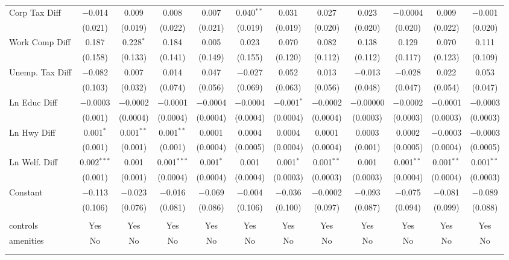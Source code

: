 \begin{table}[!htbp]
\begin{tabular}{@{\extracolsep{5pt}}lccccccccccc}
  Corp Tax Diff & $-$0.014 & 0.009 & 0.008 & 0.007 & 0.040$^{**}$ & 0.031 & 0.027 & 0.023 & $-$0.0004 & 0.009 & $-$0.001 \\ 
  & (0.021) & (0.019) & (0.022) & (0.021) & (0.019) & (0.019) & (0.020) & (0.020) & (0.020) & (0.022) & (0.020) \\ 
  Work Comp Diff & 0.187 & 0.228$^{*}$ & 0.184 & 0.005 & 0.023 & 0.070 & 0.082 & 0.138 & 0.129 & 0.070 & 0.111 \\ 
  & (0.158) & (0.133) & (0.141) & (0.149) & (0.155) & (0.120) & (0.112) & (0.112) & (0.117) & (0.123) & (0.109) \\ 
  Unemp. Tax Diff & $-$0.082 & 0.007 & 0.014 & 0.047 & $-$0.027 & 0.052 & 0.013 & $-$0.013 & $-$0.028 & 0.022 & 0.053 \\ 
  & (0.103) & (0.032) & (0.074) & (0.056) & (0.069) & (0.063) & (0.056) & (0.048) & (0.047) & (0.054) & (0.047) \\ 
  Ln Educ Diff & $-$0.0003 & $-$0.0002 & $-$0.0001 & $-$0.0004 & $-$0.0004 & $-$0.001$^{*}$ & $-$0.0002 & $-$0.00000 & $-$0.0002 & $-$0.0001 & $-$0.0003 \\ 
  & (0.001) & (0.0004) & (0.0004) & (0.0004) & (0.0004) & (0.0004) & (0.0004) & (0.0003) & (0.0003) & (0.0003) & (0.0003) \\ 
  Ln Hwy Diff & 0.001$^{*}$ & 0.001$^{**}$ & 0.001$^{**}$ & 0.0001 & 0.0004 & 0.0004 & 0.0001 & 0.0003 & 0.0002 & $-$0.0003 & $-$0.0003 \\ 
  & (0.001) & (0.001) & (0.001) & (0.0004) & (0.0005) & (0.0004) & (0.0004) & (0.001) & (0.0005) & (0.0004) & (0.0005) \\ 
  Ln Welf. Diff & 0.002$^{***}$ & 0.001 & 0.001$^{***}$ & 0.001$^{*}$ & 0.001 & 0.001$^{*}$ & 0.001$^{**}$ & 0.001 & 0.001$^{**}$ & 0.001$^{**}$ & 0.001$^{**}$ \\ 
  & (0.001) & (0.001) & (0.0004) & (0.0004) & (0.0004) & (0.0003) & (0.0003) & (0.0003) & (0.0004) & (0.0004) & (0.0003) \\ 
  Constant & $-$0.113 & $-$0.023 & $-$0.016 & $-$0.069 & $-$0.004 & $-$0.036 & $-$0.0002 & $-$0.093 & $-$0.075 & $-$0.081 & $-$0.089 \\ 
  & (0.106) & (0.076) & (0.081) & (0.086) & (0.106) & (0.100) & (0.097) & (0.087) & (0.094) & (0.099) & (0.088) \\ 
 \hline \\[-1.8ex] 
controls & Yes & Yes & Yes & Yes & Yes & Yes & Yes & Yes & Yes & Yes & Yes \\ 
amenities & No & No & No & No & No & No & No & No & No & No & No \\ 
\hline \\[-1.8ex] 
\hline 
\hline \\[-1.8ex] 
\end{tabular} 
\end{table} 
